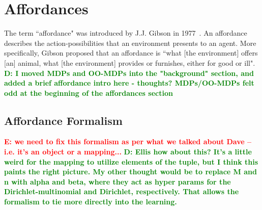 \documentclass[conference]{IEEEtran}
\newcommand{\dnote}[1]{\textcolor{Green}{\textbf{D: #1}}}
\newcommand{\enote}[1]{\textcolor{Red}{\textbf{E: #1}}}
\begin{document}




\section{Affordances}
\label{sec:affordances}

The term ``affordance" was introduced by J.J. Gibson in 1977~\citep{gibson77}. An 
affordance describes the action-possibilities that an environment presents to an agent.
More specifically, Gibson proposed that an affordance is ``what [the environment] offers
[an] animal, what [the environment] provides or furnishes, either for good or ill".
\dnote{I moved MDPs and OO-MDPs into the "background" section, and added a brief affordance intro here - thoughts? MDPs/OO-MDPs felt odd at the beginning of the affordances section}

\subsection{Affordance Formalism}

\enote{we need to fix this formalism as per what we talked about Dave -- i.e. it's an object or a mapping...}
\dnote{Ellis how about this? It's a little weird for the mapping to utilize elements of the tuple, but I think this
paints the right picture. My other thought would be to replace M and n with alpha and beta, where they act as hyper params for
the Dirichlet-multinomial and Dirichlet, respectively. That allows the formalism to tie more directly into the learning.}
\end{document}
